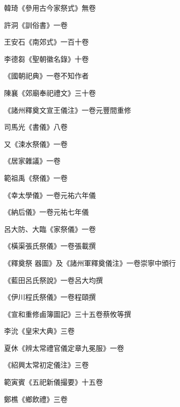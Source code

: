 \begin{pinyinscope}
 韓琦《參用古今家祭式》無卷



 許洞《訓俗書》一卷



 王安石《南郊式》一百十卷



 李德芻《聖朝徽名錄》十卷



 《國朝祀典》一卷不知作者



 陳襄《郊廟奉祀禮文》三十卷



 《諸州釋奠文宣王儀注》一卷元豐間重修



 司馬光《書儀》八卷



 又《涑水祭儀》一卷



 《居家雜議》一卷



 範祖禹《祭儀》一卷



 《幸太學儀》一卷元祐六年儀



 《納后儀》一卷元祐七年儀



 呂大防、大臨《家祭儀》一卷



 《橫渠張氏祭儀》一卷張載撰



 《釋奠祭
 器圖》及《諸州軍釋奠儀注》一卷崇寧中頒行



 《藍田呂氏祭說》一卷呂大均撰



 《伊川程氏祭儀》一卷程頤撰



 《宣和重修鹵簿圖記》三十五卷蔡攸等撰



 李沇《皇宋大典》三卷



 夏休《辨太常禮官儀定章九冕服》一卷



 《紹興太常初定儀注》三卷



 範寅賓《五祀新儀撮要》十五卷



 鄭樵《鄉飲禮》三卷




\end{pinyinscope}
